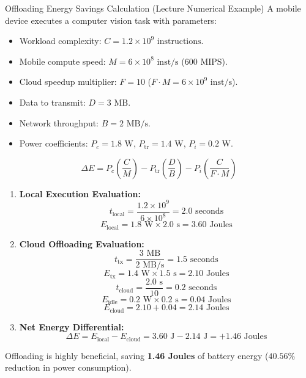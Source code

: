 \begin{solved}{Offloading Energy Savings Calculation (Lecture Numerical Example)}
\Given A mobile device executes a computer vision task with parameters:
\begin{itemize}
  \item Workload complexity: $C = 1.2 \times 10^9\text{ instructions}$.
  \item Mobile compute speed: $M = 6 \times 10^8\text{ inst/s}$ ($600\text{ MIPS}$).
  \item Cloud speedup multiplier: $F = 10$ ($F \cdot M = 6 \times 10^9\text{ inst/s}$).
  \item Data to transmit: $D = 3\text{ MB}$.
  \item Network throughput: $B = 2\text{ MB/s}$.
  \item Power coefficients: $P_c = 1.8\text{ W}$, $P_{\text{tr}} = 1.4\text{ W}$, $P_i = 0.2\text{ W}$.
\end{itemize}
\Formula
\begin{equation}
\Delta E = P_c \left(\frac{C}{M}\right) - P_{\text{tr}} \left(\frac{D}{B}\right) - P_i \left(\frac{C}{F \cdot M}\right)
\end{equation}
\Steps
\begin{enumerate}[leftmargin=*]
  \item \textbf{Local Execution Evaluation:}
  \begin{equation}
  t_{\text{local}} = \frac{1.2 \times 10^9}{6 \times 10^8} = 2.0\text{ seconds}
  \end{equation}
  \begin{equation}
  E_{\text{local}} = 1.8\text{ W} \times 2.0\text{ s} = 3.60\text{ Joules}
  \end{equation}
  \item \textbf{Cloud Offloading Evaluation:}
  \begin{equation}
  t_{\text{tx}} = \frac{3\text{ MB}}{2\text{ MB/s}} = 1.5\text{ seconds}
  \end{equation}
  \begin{equation}
  E_{\text{tx}} = 1.4\text{ W} \times 1.5\text{ s} = 2.10\text{ Joules}
  \end{equation}
  \begin{equation}
  t_{\text{cloud}} = \frac{2.0\text{ s}}{10} = 0.2\text{ seconds}
  \end{equation}
  \begin{equation}
  E_{\text{idle}} = 0.2\text{ W} \times 0.2\text{ s} = 0.04\text{ Joules}
  \end{equation}
  \begin{equation}
  E_{\text{cloud}} = 2.10 + 0.04 = 2.14\text{ Joules}
  \end{equation}
  \item \textbf{Net Energy Differential:}
  \begin{equation}
  \Delta E = E_{\text{local}} - E_{\text{cloud}} = 3.60\text{ J} - 2.14\text{ J} = +1.46\text{ Joules}
  \end{equation}
\end{enumerate}
\Answer Offloading is highly beneficial, saving \textbf{1.46 Joules} of battery energy ($40.56\%$ reduction in power consumption).
\end{solved}

